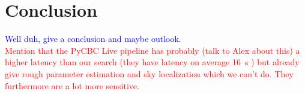 \section{Conclusion}
\textcolor{blue}{Well duh, give a conclusion and maybe outlook.}\\
\textcolor{red}{Mention that the PyCBC Live pipeline has probably (talk to Alex about this) a higher latency than our search (they have latency on average \SI{16}{\s} \cite{pycbc_live}) but already give rough parameter estimation and sky localization which we can't do. They furthermore are a lot more sensitive.}